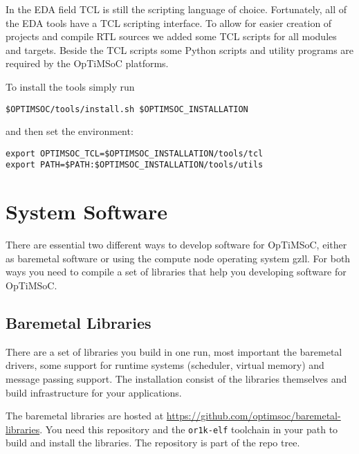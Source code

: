In the EDA field TCL is still the scripting language of choice.
Fortunately, all of the EDA tools have a TCL scripting interface. To
allow for easier creation of projects and compile RTL sources we added
some TCL scripts for all modules and targets. Beside the TCL scripts
some Python scripts and utility programs are required by the OpTiMSoC
platforms.

To install the tools simply run

\begin{lstlisting}
$OPTIMSOC/tools/install.sh $OPTIMSOC_INSTALLATION
\end{lstlisting}

and then set the environment:

\begin{lstlisting}
export OPTIMSOC_TCL=$OPTIMSOC_INSTALLATION/tools/tcl
export PATH=$PATH:$OPTIMSOC_INSTALLATION/tools/utils
\end{lstlisting}

\section{System Software}

There are essential two different ways to develop software for
OpTiMSoC, either as baremetal software or using the compute node
operating system gzll. For both ways you need to compile a set of
libraries that help you developing software for OpTiMSoC.

\subsection{Baremetal Libraries}

There are a set of libraries you build in one run, most important the
baremetal drivers, some support for runtime systems (scheduler,
virtual memory) and message passing support. The installation consist
of the libraries themselves and build infrastructure for your
applications.

The baremetal libraries are hosted at
\url{https://github.com/optimsoc/baremetal-libraries}. You need this
repository and the \verb|or1k-elf| toolchain in your path to build and
install the libraries. The repository is part of the repo tree.



